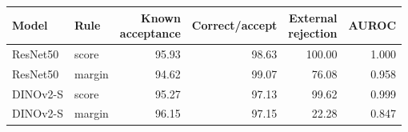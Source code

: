 \begin{tabular}{llrrrr}
\toprule
Model & Rule & \makecell{Known\\acceptance} & Correct/accept & \makecell{External\\rejection} & AUROC \\
\midrule
ResNet50 & score & 95.93 & 98.63 & 100.00 & 1.000 \\
ResNet50 & margin & 94.62 & 99.07 & 76.08 & 0.958 \\
DINOv2-S & score & 95.27 & 97.13 & 99.62 & 0.999 \\
DINOv2-S & margin & 96.15 & 97.15 & 22.28 & 0.847 \\
\bottomrule
\end{tabular}
